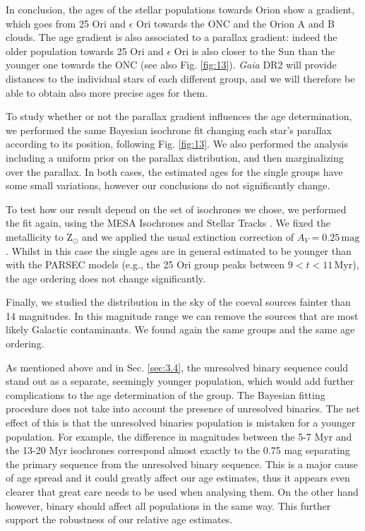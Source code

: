 \documentclass[twocolumn]{aa}
\begin{document}
In conclusion, the ages of the stellar populations towards Orion show a gradient, which goes from 25 Ori and $\epsilon$ Ori towards the ONC and the Orion A and B clouds.
The age gradient is also associated to a parallax gradient: indeed the older population towards 25 Ori and $\epsilon$ Ori is also closer to the Sun than the younger one towards the ONC (see also Fig. \ref{fig:13}). \textit{Gaia} DR2 will provide distances to the individual stars of each different group, and we will therefore be able to obtain also more precise ages for them. 


To study whether or not the parallax gradient influences the age determination, we performed the same Bayesian isochrone fit changing each star's parallax according to its position, following  Fig. \ref{fig:13}.
We also performed the analysis including a uniform prior on the parallax distribution, and then marginalizing over the parallax. %
In both cases, the estimated ages for the single groups have some small variations, however our conclusions do not significantly change.
 
To test how our  result depend on the set of isochrones we chose, we performed the fit again, using the MESA Isochrones and Stellar Tracks \citep[MIST][]{Mist0, Mist1}. We fixed the metallicity to $\mathrm{Z_{\odot}}$ and we applied the usual extinction correction of $A_V = 0.25 \, \mathrm{mag}$. Whilst in this case the single ages are in general estimated to be younger than with the PARSEC models (e.g., the 25 Ori group peaks between  $9 < t < 11 \, \mathrm{Myr}$), the age ordering does not change significantly.
 
Finally, we studied the distribution in the sky of the coeval sources fainter than 14 magnitudes. In this magnitude range we can remove the sources that are most likely Galactic contaminants. We found again the same groups and the same age ordering.


   
As mentioned above and in Sec. \ref{sec:3.4}, the unresolved binary sequence could stand out as a separate, seemingly younger population, which would add further complications to the age determination of the group. The Bayesian fitting procedure does not take into account the presence of unresolved binaries. The net effect of this is that the unresolved binaries population is mistaken for a younger population. 
For example, the difference in magnitudes between the 5-7 Myr and the 13-20 Myr isochrones correspond almost exactly to the 0.75 mag separating the primary sequence from the unresolved binary sequence. This is a major cause of age spread and it could greatly affect our age estimates, thus it appears even clearer that great care needs to be used when analysing them.
On the other hand however, binary should affect all populations in the same way. This further support the robustness of our relative age estimates. 
 
\end{document}
